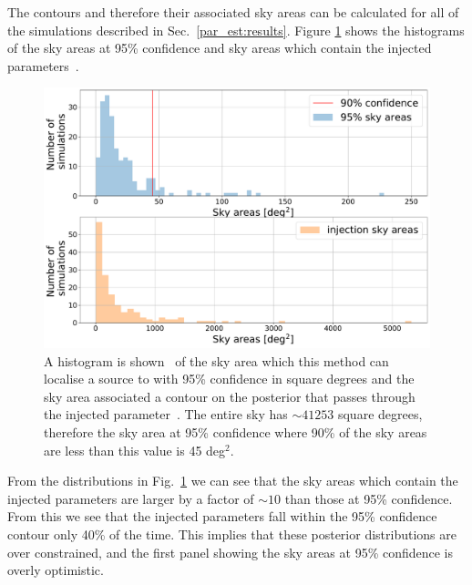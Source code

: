 The contours and therefore their associated sky areas can be calculated for all
of the simulations described in Sec.~\ref{par_est:results}. Figure
\ref{par_est:results:sky_area} shows the histograms of the sky areas at 95\%
confidence and sky areas which contain the injected parameters~.
%
\begin{figure}[ht]
    \centering
    \includegraphics[width=\linewidth]{C5_parameter/sky_area_hist.pdf}
    \caption[histogram showing the area contained within 90\% confidence contours]{A histogram is shown~ of the sky area
which this method can localise a source to with 95\% confidence in square
degrees and the sky area associated a contour on the posterior that passes
through the injected parameter~. The
entire sky has $\sim 41253$ square degrees, therefore the sky area at 95\%
confidence where 90\% of the sky areas are less than this value is 45
deg$^2$.~}
\label{par_est:results:sky_area} 
\end{figure}
%
From the distributions in Fig.~\ref{par_est:results:sky_area} we can see that
the sky areas which contain the injected parameters are larger by a factor of
$\sim 10$ than those at 95\% confidence.  From this we see that the injected
parameters fall within the 95\% confidence contour only 40\% of the time.  This
implies that these posterior distributions are over constrained, and the first
panel showing the sky areas at 95\% confidence is overly optimistic.~

